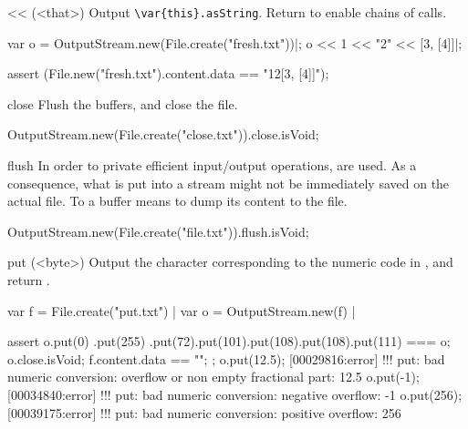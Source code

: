 \begin{urbiscriptapi}
\item[<<](<that>)%
  Output \lstinline|\var{this}.asString|.  Return \this to
  enable chains of calls.
\begin{urbiscript}
var o = OutputStream.new(File.create("fresh.txt"))|;
o << 1 << "2" << [3, [4]]|;

assert (File.new("fresh.txt").content.data == "12[3, [4]]");
\end{urbiscript}

\item[close]
  Flush the buffers, and close the file.
\begin{urbiassert}
OutputStream.new(File.create("close.txt")).close.isVoid;
\end{urbiassert}

\item[flush]%
  In order to private efficient input/output operations,
   are used.  As a consequence, what is put into a
  stream might not be immediately saved on the actual file.  To 
  a buffer means to dump its content to the file.
\begin{urbiassert}
OutputStream.new(File.create("file.txt")).flush.isVoid;
\end{urbiassert}

\item[put](<byte>)%
  Output the character corresponding to the numeric code  in
  \this, and return \this.
\begin{urbiscript}[firstnumber=1]
var f = File.create("put.txt") |
var o = OutputStream.new(f) |

assert
{
  o.put(0)
   .put(255)
   .put(72).put(101).put(108).put(108).put(111)
  === o;
  o.close.isVoid;
  f.content.data == "\0\xffHello";
};
o.put(12.5);
[00029816:error] !!! put: bad numeric conversion: overflow or non empty fractional part: 12.5
o.put(-1);
[00034840:error] !!! put: bad numeric conversion: negative overflow: -1
o.put(256);
[00039175:error] !!! put: bad numeric conversion: positive overflow: 256
\end{urbiscript}

\end{urbiscriptapi}



